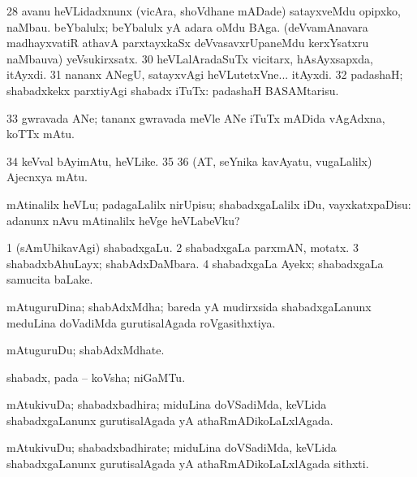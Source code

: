 {{{{{{{\num{28}  avanu heVLidadxnunx (vicAra, shoVdhane mADade) satayxveMdu opipxko, naMbau. 
  
\banum
{} beYbalulx; beYbalulx yA adara oMdu BAga. 
 (deVvamAnavara madhayxvatiR athavA parxtayxkaSx deVvasavxrUpaneMdu kerxYsatxru naMbauva) yeVsukirxsatx. 
\eanum
\numie
\num{30}  heVLalAradaSuTx vicitarx, hAsAyxsapxda, itAyxdi. 
\num{31}  nananx ANegU, satayxvAgi heVLutetxVne... itAyxdi. 
\num{32}  padashaH; shabadxkekx parxtiyAgi shabadx iTuTx:  padashaH BASAMtarisu. 
\num{33}  gwravada ANe; tananx gwravada meVle ANe iTuTx mADida vAgAdxna, koTTx mAtu. 
\num{34} keVval bAyimAtu, heVLike. 
\num{35}  
\num{36}  (AT, seYnika kavAyatu, \mo vugaLalilx) Ajecnxya mAtu. 
\enum
\emng
\eentry

\bentry
{} 
\gl{\sakirx}
\expl{}
\bmng
mAtinalilx heVLu; padagaLalilx nirUpisu; shabadxgaLalilx iDu, vayxkatxpaDisu:  adanunx nAvu mAtinalilx heVge heVLabeVku? 
\emng
\eentry

\bentry
{} 
\gl{\nA}
\expl{}
\bmng
\bnum
\num{1} (sAmUhikavAgi) shabadxgaLu. 
\num{2} shabadxgaLa parxmAN, motatx. 
\num{3} shabadxbAhuLayx; shabAdxDaMbara. 
\num{4} shabadxgaLa Ayekx; shabadxgaLa samucita baLake. 
\enum
\emng
\eentry

\bentry
{} 
\gl{\gu}
\expl{}
\bmng
mAtuguruDina; shabAdxMdha; bareda yA mudirxsida shabadxgaLanunx meduLina doVadiMda gurutisalAgada roVgasithxtiya. 
\emng
\eentry

\bentry
{} 
\gl{\nA}
\expl{}
\bmng
mAtuguruDu; shabAdxMdhate. 
\emng
\eentry

\bentry
{} 
\gl{\nA}
\expl{}
\bmng
shabadx, pada -- koVsha; niGaMTu. 
\emng
\eentry

\bentry
{} 
\gl{\gu}
\expl{}
\bmng
mAtukivuDa; shabadxbadhira; miduLina doVSadiMda, keVLida shabadxgaLanunx gurutisalAgada yA athaRmADikoLaLxlAgada. 
\emng
\eentry

\bentry
{} 
\gl{\nA}
\expl{}
\bmng
mAtukivuDu; shabadxbadhirate; miduLina doVSadiMda, keVLida shabadxgaLanunx gurutisalAgada yA athaRmADikoLaLxlAgada sithxti. 
\emng
\eentry

}}}}}}}
